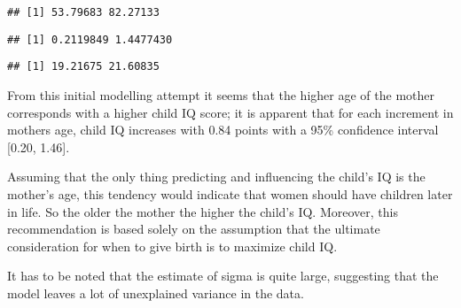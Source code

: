 \documentclass[
]{article}
\newenvironment{Shaded}{\begin{snugshade}}{\end{snugshade}}
\newcommand{\CommentTok}[1]{\textcolor[rgb]{0.56,0.35,0.01}{\textit{#1}}}
\newcommand{\FunctionTok}[1]{\textcolor[rgb]{0.00,0.00,0.00}{#1}}
\newcommand{\NormalTok}[1]{#1}
\newcommand{\SpecialCharTok}[1]{\textcolor[rgb]{0.00,0.00,0.00}{#1}}
\begin{document}
\begin{Shaded}
\end{Shaded}

\begin{verbatim}
## [1] 53.79683 82.27133
\end{verbatim}

\begin{Shaded}
\end{Shaded}

\begin{verbatim}
## [1] 0.2119849 1.4477430
\end{verbatim}

\begin{Shaded}
\end{Shaded}

\begin{verbatim}
## [1] 19.21675 21.60835
\end{verbatim}

From this initial modelling attempt it seems that the higher age of the
mother corresponds with a higher child IQ score; it is apparent that for
each increment in mothers age, child IQ increases with 0.84 points with
a 95\% confidence interval {[}0.20, 1.46{]}.

Assuming that the only thing predicting and influencing the child's IQ
is the mother's age, this tendency would indicate that women should have
children later in life. So the older the mother the higher the child's
IQ. Moreover, this recommendation is based solely on the assumption that
the ultimate consideration for when to give birth is to maximize child
IQ.

It has to be noted that the estimate of sigma is quite large, suggesting
that the model leaves a lot of unexplained variance in the data.
\end{document}
